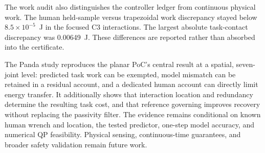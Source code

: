\documentclass[11pt]{article}
\begin{document}
The work audit also distinguishes the controller ledger from continuous
physical work. The human held-sample versus trapezoidal work discrepancy
stayed below $8.5\times10^{-5}$~J in the focused C3 interactions. The largest
absolute task-contact discrepancy was 0.00649~J. These differences are
reported rather than
absorbed into the certificate.

The Panda study reproduces the planar PoC's central result at a spatial,
seven-joint level: predicted task work can be exempted, model mismatch can be
retained in a residual account, and a dedicated human account can directly
limit energy transfer. It additionally shows that interaction location and
redundancy determine the resulting task cost, and that reference governing
improves recovery without replacing the passivity filter. The evidence
remains conditional on known human wrench and location, the tested predictor,
one-step model accuracy, and numerical QP feasibility. Physical sensing,
continuous-time guarantees, and broader safety validation remain future work.
\end{document}
